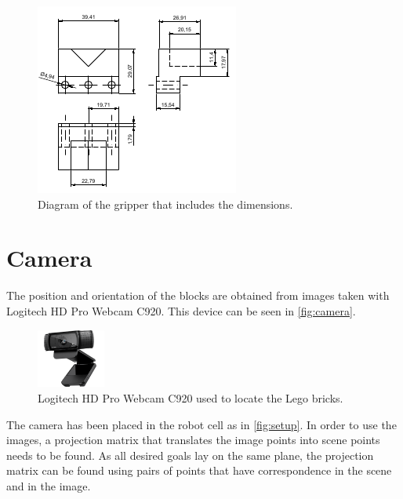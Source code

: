 \begin{figure}[H]
    \includegraphics[width=.4\textwidth]{figures/gripper}
    \caption{Diagram of the gripper that includes the dimensions.}
    \label{fig:gripper}  
\end{figure}


\section{Camera} \label{sec:camera}
The position and orientation of the blocks are obtained from images taken with Logitech HD Pro Webcam C920. This device can be seen in \autoref{fig:camera}.
\begin{figure}[H]
    \includegraphics[width=0.2\textwidth]{figures/camera.png}
    \caption{Logitech HD Pro Webcam C920 used to locate the Lego bricks.\cite{camera} }
    \label{fig:camera}
\end{figure}
The camera has been placed in the robot cell as in \autoref{fig:setup}. In order to use the images, a projection matrix that translates the image points into scene points needs to be found. As all desired goals lay on the same plane, the projection matrix can be found using pairs of points that have correspondence in the scene and in the image.


